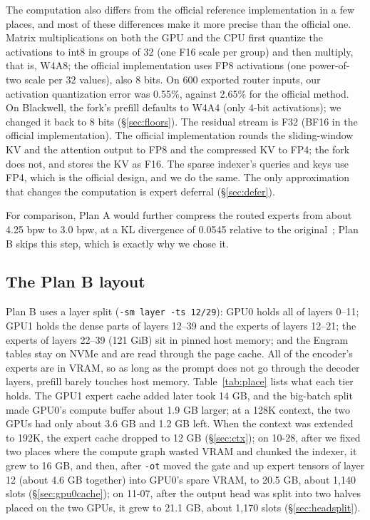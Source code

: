 \documentclass[11pt,a4paper]{article}
\newcommand{\code}[1]{\texttt{#1}}
\begin{document}
The computation also differs from the official reference implementation in a few places, and most of these differences make it more precise than the official one. Matrix multiplications on both the GPU and the CPU first quantize the activations to int8 in groups of 32 (one F16 scale per group) and then multiply, that is, W4A8; the official implementation uses FP8 activations (one power-of-two scale per 32 values), also 8 bits. On 600 exported router inputs, our activation quantization error was 0.55\%, against 2.65\% for the official method. On Blackwell, the fork's prefill defaults to W4A4 (only 4-bit activations); we changed it back to 8 bits (\S\ref{sec:floors}). The residual stream is F32 (BF16 in the official implementation). The official implementation rounds the sliding-window KV and the attention output to FP8 and the compressed KV to FP4; the fork does not, and stores the KV as F16. The sparse indexer's queries and keys use FP4, which is the official design, and we do the same. The only approximation that changes the computation is expert deferral (\S\ref{sec:defer}).

For comparison, Plan A would further compress the routed experts from about 4.25 bpw to 3.0 bpw, at a KL divergence of 0.0545 relative to the original~\cite{diffbot}; Plan B skips this step, which is exactly why we chose it.

\subsection{The Plan B layout}

Plan B uses a layer split (\code{-sm layer -ts 12/29}): GPU0 holds all of layers 0--11; GPU1 holds the dense parts of layers 12--39 and the experts of layers 12--21; the experts of layers 22--39 (121 GiB) sit in pinned host memory; and the Engram tables stay on NVMe and are read through the page cache. All of the encoder's experts are in VRAM, so as long as the prompt does not go through the decoder layers, prefill barely touches host memory. Table~\ref{tab:place} lists what each tier holds. The GPU1 expert cache added later took 14 GB, and the big-batch split made GPU0's compute buffer about 1.9 GB larger; at a 128K context, the two GPUs had only about 3.6 GB and 1.2 GB left. When the context was extended to 192K, the expert cache dropped to 12 GB (\S\ref{sec:ctx}); on 10-28, after we fixed two places where the compute graph wasted VRAM and chunked the indexer, it grew to 16 GB, and then, after \code{-ot} moved the gate and up expert tensors of layer 12 (about 4.6 GB together) into GPU0's spare VRAM, to 20.5 GB, about 1,140 slots (\S\ref{sec:gpu0cache}); on 11-07, after the output head was split into two halves placed on the two GPUs, it grew to 21.1 GB, about 1,170 slots (\S\ref{sec:headsplit}).
\end{document}
